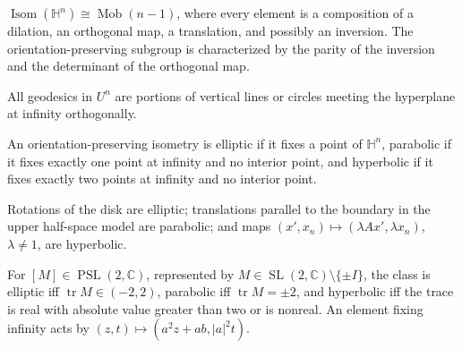 \begin{lemma}
\label{lem:chow-iv-isometry-group-hyperbolic-space}
\(\operatorname{Isom}(\mathbb H^n)\cong\operatorname{Mob}(n-1)\), where every
element is a composition of a dilation, an orthogonal map, a translation, and
possibly an inversion.  The orientation-preserving subgroup is characterized
by the parity of the inversion and the determinant of the orthogonal map.
\end{lemma}

\begin{lemma}
\label{lem:chow-iv-upper-half-space-geodesics}
All geodesics in \(U^n\) are portions of vertical lines or circles meeting the
hyperplane at infinity orthogonally.
\end{lemma}

\begin{definition}
\label{def:chow-iv-isometry-types}
An orientation-preserving isometry is elliptic if it fixes a point of
\(\mathbb H^n\), parabolic if it fixes exactly one point at infinity and no
interior point, and hyperbolic if it fixes exactly two points at infinity and
no interior point.
\end{definition}

\begin{example}
\label{ex:chow-iv-standard-isometry-types}
Rotations of the disk are elliptic; translations parallel to the boundary in
the upper half-space model are parabolic; and maps
\((x',x_n)\mapsto(\lambda A x',\lambda x_n)\), \(\lambda\ne1\), are hyperbolic.
\end{example}

\begin{lemma}
\label{lem:chow-iv-trace-isometry-classification}
For \([M]\in\operatorname{PSL}(2,\mathbb C)\), represented by
\(M\in\operatorname{SL}(2,\mathbb C)\setminus\{\pm I\}\), the class is
elliptic iff \(\operatorname{tr}M\in(-2,2)\), parabolic iff
\(\operatorname{tr}M=\pm2\), and hyperbolic iff the trace is real with
absolute value greater than two or is nonreal.  An element fixing infinity
acts by \((z,t)\mapsto(a^2z+ab,|a|^2t)\).
\end{lemma}


